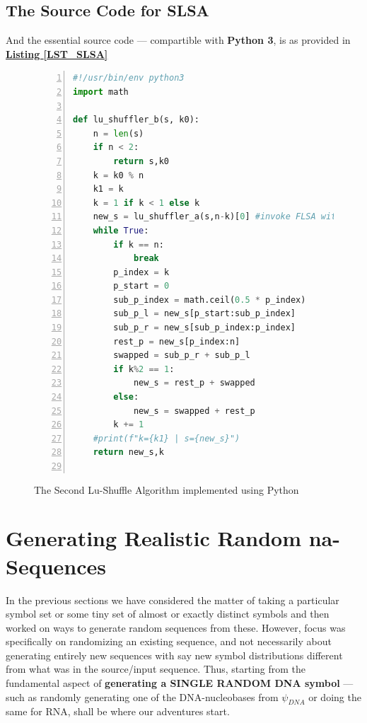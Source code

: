 \documentclass[a4paper, 18pt]{book} %
\begin{document}
\subsection{The Source Code for SLSA}
\label{SECSLSACODE}

And the essential source code --- compartible with \textbf{Python 3}, is as provided in  \textbf{\hyperref[LST_SLSA]{Listing \ref{LST_SLSA}}}


\begin{figure}[H]
  \begin{center}
  \begin{lstlisting}[caption={The SLSA}, label={LST_SLSA}, language=Python, frame=single, numbers=left, basicstyle=\ttfamily,  commentstyle=\color{blue}]
#!/usr/bin/env python3
import math

def lu_shuffler_b(s, k0):
    n = len(s)
    if n < 2:
        return s,k0
    k = k0 % n
    k1 = k
    k = 1 if k < 1 else k
    new_s = lu_shuffler_a(s,n-k)[0] #invoke FLSA with k0=n-k
    while True:
        if k == n:
            break
        p_index = k
        p_start = 0
        sub_p_index = math.ceil(0.5 * p_index)
        sub_p_l = new_s[p_start:sub_p_index]
        sub_p_r = new_s[sub_p_index:p_index]
        rest_p = new_s[p_index:n]
        swapped = sub_p_r + sub_p_l
        if k%2 == 1:
            new_s = rest_p + swapped
        else:
            new_s = swapped + rest_p
        k += 1
    #print(f"k={k1} | s={new_s}")
    return new_s,k
    
\end{lstlisting}
  \end{center}
  \caption{The Second Lu-Shuffle Algorithm implemented using Python}
\end{figure}


\section{Generating Realistic Random na-Sequences}

In the previous sections we have considered the matter of taking a particular symbol set or some tiny set of almost or exactly distinct symbols and then worked on ways to generate random sequences from these. However, focus was specifically on randomizing an existing sequence, and not necessarily about generating entirely new sequences with say new symbol distributions different from what was in the source/input sequence. Thus, starting from the fundamental aspect of \textbf{generating a SINGLE RANDOM DNA symbol} --- such as randomly generating one of the DNA-nucleobases from $\psi_{DNA}$ or doing the same for RNA, shall be where our adventures start.
\end{document}
